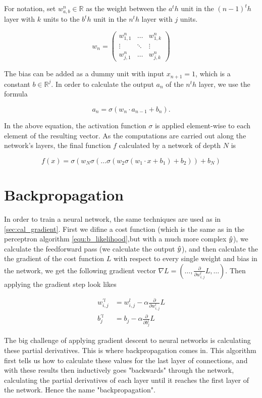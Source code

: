 For notation, set $w^n_{a, b} \in \mathbb{R}$ as the weight between the $a^th$ unit in the $(n - 1)^th$ layer with $k$ units to the $b^th$ unit in the $n^th$ layer with $j$ units.

\begin{equation}
  w_n = \begin{pmatrix}
    w^n_{1, 1} & \ldots & w^n_{1, k} \\
    \vdots & \ddots & \vdots \\
    w^n_{j, 1} & \ldots & w^n_{j, k}
  \end{pmatrix}
\end{equation}

The bias can be added as a dummy unit with input $x_{n+1} = 1$, which is a constant $b \in \mathbb{R}^j$. In order to calculate the output $a_n$ of the $n^th$ layer, we use the formula

$$
a_n = \sigma (w_n \cdot a_{n - 1} + b_n).
$$

In the above equation, the activation function $\sigma$ is applied element-wise to each element of the resulting vector. As the computations are carried out along the network's layers, the final function $f$ calculated by a network of depth $N$ is

$$
f(x) = \sigma(w_N\sigma(\ldots\sigma (w_2 \sigma(w_1 \cdot x + b_1) + b_2)) + b_N)
$$

\section{Backpropagation}
In order to train a neural network, the same techniques are used as in \cref{sec:cal_gradient}. First we difine a cost function (which is the same as in the perceptron algorithm \cref{equ:b_likelihood},but with a much more complex $\hat{y}$), we calculate the feedforward pass (we calculate the output $\hat{y}$), and then calculate the the gradient of the cost function $L$ with respect to every single weight and bias in the network, we get the following gradient vector $\nabla L = (\ldots, \frac{\partial}{\partial w^l_{i, j}} L, \ldots)$. Then applying the gradient step look likes

\begin{align*}
  w^{\prime l}_{i, j} &= w^l_{i, j} - \alpha  \frac{\partial}{\partial w^l_{i, j}} L\\
  b^{\prime l}_j &= b_j - \alpha \frac{\partial}{\partial b^l_j} L
\end{align*}

The big challenge of applying gradient descent to neural networks is calculating these partial derivatives.  This is where backpropagation comes in. This algorithm first tells us how to calculate these values for the last layer of connections, and with these results then inductively goes "backwards" through the network, calculating the partial derivatives of each layer until it reaches the first layer of the network. Hence the name "backpropagation".

